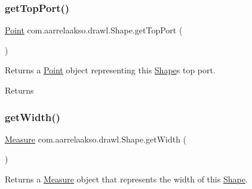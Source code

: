 \mbox{\label{classcom_1_1aarrelaakso_1_1drawl_1_1_shape_aed4e9caa294aacc973b7a531a960e9e5}} 
\subsubsection{\texorpdfstring{get\+Top\+Port()}{getTopPort()}}
{\footnotesize\ttfamily \hyperlink{classcom_1_1aarrelaakso_1_1drawl_1_1_point}{Point} com.\+aarrelaakso.\+drawl.\+Shape.\+get\+Top\+Port (\begin{DoxyParamCaption}{ }\end{DoxyParamCaption})\hspace{0.3cm}{\ttfamily [inherited]}}



Returns a \hyperlink{classcom_1_1aarrelaakso_1_1drawl_1_1_point}{Point} object representing this \hyperlink{classcom_1_1aarrelaakso_1_1drawl_1_1_shape}{Shape}\textquotesingle{}s top port. 

\begin{DoxyReturn}{Returns}

\end{DoxyReturn}
\mbox{\label{classcom_1_1aarrelaakso_1_1drawl_1_1_shape_a3e2c58984f1bcbc2e9e86cf30868561e}} 
\subsubsection{\texorpdfstring{get\+Width()}{getWidth()}}
{\footnotesize\ttfamily \hyperlink{classcom_1_1aarrelaakso_1_1drawl_1_1_measure}{Measure} com.\+aarrelaakso.\+drawl.\+Shape.\+get\+Width (\begin{DoxyParamCaption}{ }\end{DoxyParamCaption})\hspace{0.3cm}{\ttfamily [inherited]}}



Returns a \hyperlink{classcom_1_1aarrelaakso_1_1drawl_1_1_measure}{Measure} object that represents the width of this \hyperlink{classcom_1_1aarrelaakso_1_1drawl_1_1_shape}{Shape}. 

